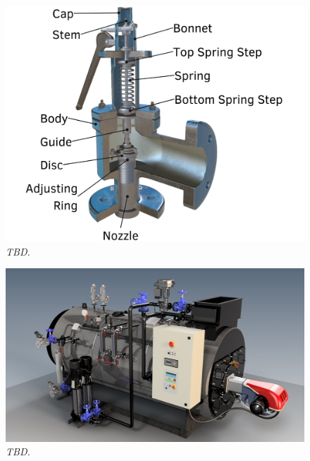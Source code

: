 


\begin{figure}[ht]
    \centerline{\includegraphics[scale=0.2]{spring_loaded_safety_valve_01.png}}
    \caption{\textit{TBD.}}
    \label{im:spring_loaded_safety_valve_01}
\end{figure}

\begin{figure}[ht]
    \centerline{\includegraphics[scale=0.2]{two_psv_firetube_boiler.jpg}}
    \caption{\textit{TBD.}}
    \label{im:two_psv_firetube_boiler}
\end{figure}





